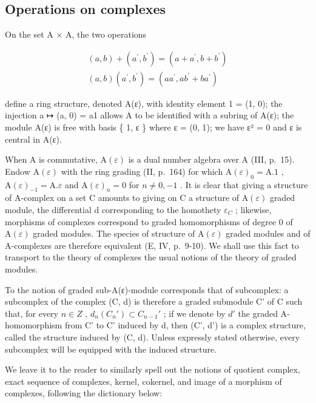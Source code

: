 \subsection{Operations on complexes}

On the set A × A, the two operations

\[
\begin{array}{l} (a, b) + (a ^ {\prime}, b ^ {\prime}) = (a + a ^ {\prime}, b + b ^ {\prime}) \\ (a, b) (a ^ {\prime}, b ^ {\prime}) = (a a ^ {\prime}, a b ^ {\prime} + b a ^ {\prime}) \end{array}
\]

define a ring structure, denoted A(ε), with identity element 1 = (1, 0); the injection a ↦ (a, 0) = a1 allows A to be identified with a subring of A(ε); the module A(ε) is free with basis \{ 1, ε \} where ε = (0, 1); we have ε² = 0 and ε is central in A(ε).

When A is commutative, \(\mathrm{A}(\varepsilon)\) is a dual number algebra over A (III, p.~15). Endow \(\mathrm{A}(\varepsilon)\) with the ring grading (II, p.~164) for which \(\mathrm{A}(\varepsilon)_{0} = \mathrm{A}.1\) , \(\mathrm{A}(\varepsilon)_{-1} = \mathrm{A}. \varepsilon\) and \(\mathrm{A}(\varepsilon)_{n} = 0\) for \(n \neq 0, -1\) . It is clear that giving a structure of A-complex on a set C amounts to giving on C a structure of \(\mathrm{A}(\varepsilon)\) graded module, the differential d corresponding to the homothety \(\varepsilon_{C}\) ; likewise, morphisms of complexes correspond to graded homomorphisms of degree 0 of \(\mathrm{A}(\varepsilon)\) graded modules. The species of structure of \(\mathrm{A}(\varepsilon)\) graded modules and of A-complexes are therefore equivalent (E, IV, p.~9-10). We shall use this fact to transport to the theory of complexes the usual notions of the theory of graded modules.

To the notion of graded sub-A(ε)-module corresponds that of subcomplex: a subcomplex of the complex (C, d) is therefore a graded submodule C' of C such that, for every \(n \in Z\) , \(d_{n}(C_{n}') \subset C_{n-1}'\) ; if we denote by \(d'\) the graded A-homomorphism from C' to C' induced by d, then (C', d') is a complex structure, called the structure induced by (C, d). Unless expressly stated otherwise, every subcomplex will be equipped with the induced structure.

We leave it to the reader to similarly spell out the notions of quotient complex, exact sequence of complexes, kernel, cokernel, and image of a morphism of complexes, following the dictionary below:

